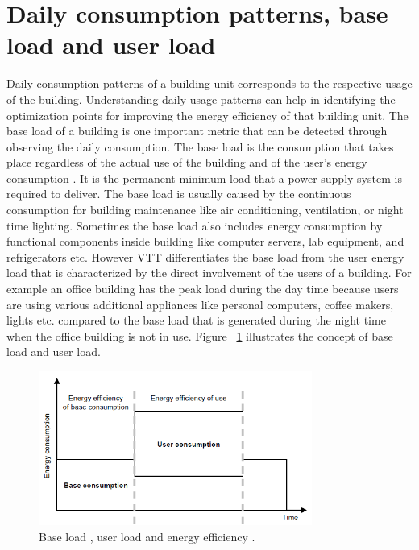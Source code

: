 \section{Daily consumption patterns, base load and user load}\label{daily}
Daily consumption patterns of a building unit corresponds to the respective usage of the building. Understanding daily usage patterns can help in identifying the optimization points for improving the energy efficiency of that building unit. The base load of a building is one important metric that can be detected through observing the daily consumption. The base load is the consumption that takes place regardless of the actual use of the building and of the user's energy consumption  \cite{forsstrommeasuring}. It is the permanent minimum load that a power supply system is required to deliver. The base load is usually caused by the continuous consumption for building maintenance like air conditioning, ventilation, or night time lighting. Sometimes the base load also includes energy consumption by functional components inside building like computer servers, lab equipment, and refrigerators etc. However VTT differentiates the base load from the user energy load that is characterized by the direct involvement of the users of a building. For example an office building has the peak load during the day time because users are using various additional appliances like personal computers, coffee makers, lights etc. compared to the base load that is generated during the night time when the office building is not in use. Figure  ~\ref{fig:baseload} illustrates the concept of base load and user load.
\begin{figure}[!ht]
  \begin{center}
    \includegraphics[width=0.8\textwidth]{images/baseload.png}
    \caption{ Base load , user load and energy efficiency \cite{forsstrommeasuring}.}
    \label{fig:baseload}
  \end{center}
\end{figure}

